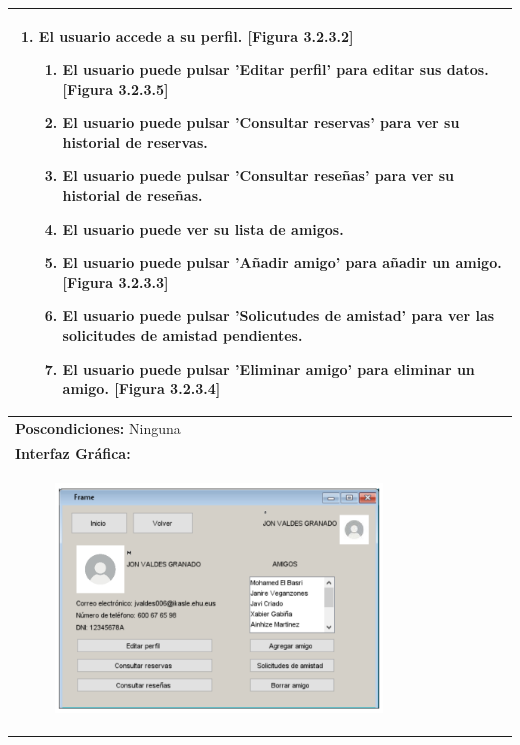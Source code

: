 \documentclass{report}
\begin{document}
\begin{center}
\begin{longtable}{|p{\linewidth}|}
                        \begin{enumerate}
                            \item El usuario accede a su perfil. [Figura 3.2.3.2]
                            \begin{enumerate}
                                \item El usuario puede pulsar 'Editar perfil' para editar sus datos. [Figura 3.2.3.5]
                                \item El usuario puede pulsar 'Consultar reservas' para ver su historial de reservas.
                                \item El usuario puede pulsar 'Consultar reseñas' para ver su historial de reseñas.
                                \item El usuario puede ver su lista de amigos.
                                \item El usuario puede pulsar 'Añadir amigo' para añadir un amigo. [Figura 3.2.3.3]
                                \item El usuario puede pulsar 'Solicutudes de amistad' para ver las solicitudes de amistad pendientes.
                                \item El usuario puede pulsar 'Eliminar amigo' para eliminar un amigo. [Figura 3.2.3.4]
                            \end{enumerate}
                        \end{enumerate}\\
                        \hline
                        \textbf{Poscondiciones:} Ninguna\\
                        \hline
                        \textbf{Interfaz Gráfica:}\\
                        \begin{figure}[H]
                            \centering
                            \includegraphics[width=0.8\textwidth]{./img/grafico/InterfazMenu.png}

\end{figure}
\end{longtable}
\end{center}
\end{document}

